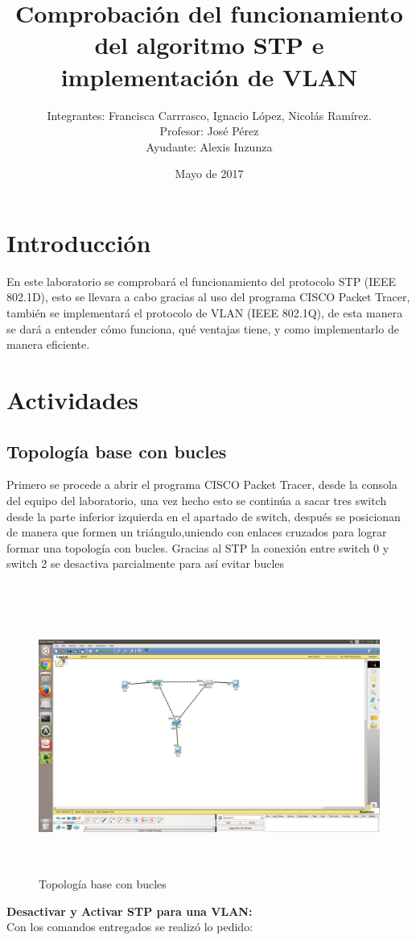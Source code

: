 \documentclass{udpreport}
\title{Comprobación del funcionamiento del algoritmo STP e implementación de VLAN}
\author{Integrantes: Francisca Carrrasco, Ignacio López, Nicolás Ramírez.\\Profesor: José Pérez
\\Ayudante: Alexis Inzunza}
\date{Mayo de 2017}
\begin{document}
\maketitle
\tableofcontents
\listoffigures
\chapter{Introducción}
  En este laboratorio se comprobará el funcionamiento del protocolo STP (IEEE 802.1D),  esto se llevara a cabo gracias al uso del programa CISCO Packet Tracer, también se implementará el protocolo de  VLAN (IEEE 802.1Q), de esta manera se dará a entender cómo funciona, qué  ventajas tiene, y como implementarlo de manera eficiente.
  	
  \vfill
  
\chapter{Actividades}
	\section{Topología base con bucles}
	Primero se procede a abrir el programa CISCO Packet Tracer, desde la consola del equipo del laboratorio, una vez hecho esto se
	continúa a sacar tres switch desde la parte inferior izquierda en el apartado de switch, después se posicionan de manera que
	formen un triángulo,uniendo con enlaces cruzados para lograr formar una topología con bucles. Gracias al STP la conexión entre switch 0 y switch 2 se desactiva parcialmente para así evitar bucles \\\\
	
	\begin{figure}[h]
    \centering
    \includegraphics[width=15cm, height=9cm]{2.png}
    \caption{Topología base con bucles}
    \end{figure}
    \newpage
    	{\large \bf{Desactivar y Activar STP para una VLAN: }}\\
    	Con los comandos entregados se realizó lo pedido:
    	
\end{document}
